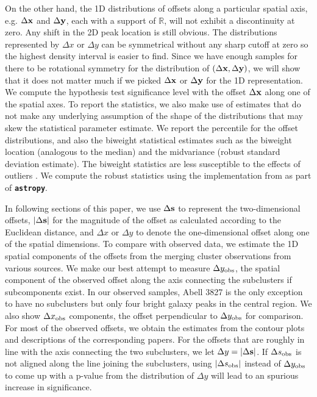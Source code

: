 On the other hand, 
the 1D distributions of offsets along a particular spatial axis, 
e.g. $\Delta {\bf x}$ and $\Delta {\bf y}$,
each with a support of $\mathbb{R}$, will not exhibit a discontinuity at zero.
Any shift in the 2D peak location is still obvious. 
The distributions represented by $\Delta x$ or $\Delta y$ 
can be symmetrical without any sharp cutoff at zero so 
the highest density interval is easier to find.
Since we have enough samples for there to be
rotational symmetry for the distribution of $(\Delta {\bf x}, \Delta {\bf y})$,
we will show that it does not
matter much if we picked $\Delta {\bf x}$ or $\Delta {\bf y}$ for the 1D representation.
We compute the hypothesis test significance level with the 
 offset $\Delta {\bf x}$ along one of the spatial axes. 
To report the statistics, we also make use of estimates that do not make any
underlying assumption of the shape of the distributions that may skew the
statistical parameter estimate.
We report the percentile for the offset distributions, and also the biweight 
statistical estimates such as the biweight 
location (analogous to the median)
and the midvariance (robust standard deviation
estimate). The biweight statistics are less susceptible to the effects of
outliers \citep{Beers90}. We compute the robust statistics using the implementation
from \cite{astropy} as part of {\bf \texttt{astropy}}. 

In following sections of this paper, we use $\Delta {\bf s}$  to represent the
two-dimensional offsets, $|\Delta {\bf s}|$ for the magnitude of the offset as calculated
according to the Euclidean distance, and $\Delta x$ or $\Delta y$ to denote the
one-dimensional offset along one of the spatial dimensions.
To compare with observed data, we estimate the 1D spatial components of
the offsets from the merging cluster observations from various sources.   
We make our best attempt to measure $\Delta y_{\rm obs}$, the spatial component of the
observed offset along the axis connecting the subclusters if subcomponents exist. 
In our observed samples, Abell 3827 is the only exception to have no
subclusters but only four bright galaxy peaks in the central region. 
We also show $\Delta x_{\rm obs}$ components, the offset perpendicular to
$\Delta y_{\rm obs}$ for comparison.
For most of the observed offsets, we obtain the estimates from the contour plots 
and descriptions of the corresponding papers. 
For the offsets that are roughly in line with the axis connecting the two subclusters,
we let $\Delta y = |\Delta {\bf s}|$. 
If $\Delta s_{\rm obs}$ is not aligned along the line joining the subclusters,
using $|\Delta s_{\rm obs}|$ instead of $\Delta y_{\rm obs}$ to come 
up with a p-value from the distribution of 
$\Delta y$ will lead to an spurious increase in significance.


